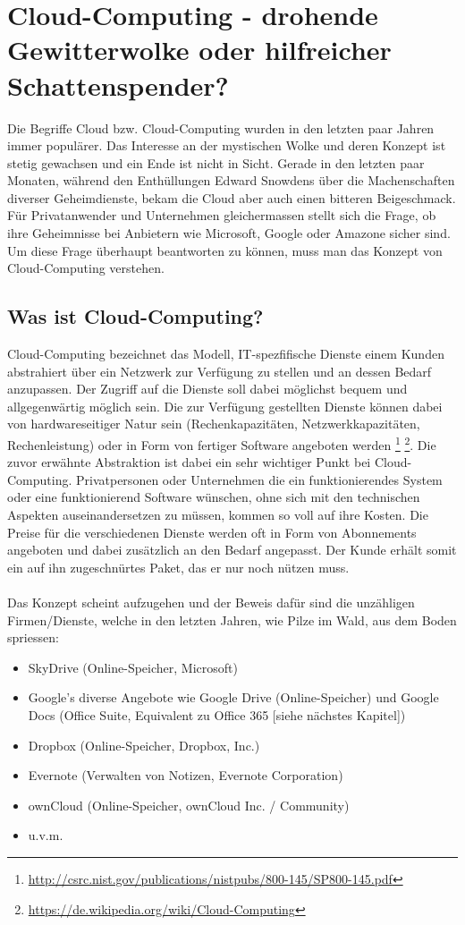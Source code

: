 \newpage
\section{Cloud-Computing - drohende Gewitterwolke oder hilfreicher Schattenspender?}
Die Begriffe Cloud bzw. Cloud-Computing wurden in den letzten paar Jahren immer populärer. Das Interesse an der mystischen Wolke und deren Konzept ist stetig gewachsen und ein Ende ist nicht in Sicht. Gerade in den letzten paar Monaten, während den Enthüllungen Edward Snowdens über die Machenschaften diverser Geheimdienste, bekam die Cloud aber auch einen bitteren Beigeschmack. Für Privatanwender und Unternehmen gleichermassen stellt sich die Frage, ob ihre Geheimnisse bei Anbietern wie Microsoft, Google oder Amazone sicher sind. Um diese Frage überhaupt beantworten zu können, muss man das Konzept von Cloud-Computing verstehen.

\subsection{Was ist Cloud-Computing?}
Cloud-Computing bezeichnet das Modell, IT-spezfifische Dienste einem Kunden abstrahiert über ein Netzwerk zur Verfügung zu stellen und an dessen Bedarf anzupassen. Der Zugriff auf die Dienste soll dabei möglichst bequem und allgegenwärtig möglich sein. Die zur Verfügung gestellten Dienste können dabei von hardwareseitiger Natur sein (Rechenkapazitäten, Netzwerkkapazitäten, Rechenleistung) oder in Form von fertiger Software angeboten werden 
\footnote{\url{http://csrc.nist.gov/publications/nistpubs/800-145/SP800-145.pdf}} 
\footnote{\url{https://de.wikipedia.org/wiki/Cloud-Computing}}. 
Die zuvor erwähnte Abstraktion ist dabei ein sehr wichtiger Punkt bei Cloud-Computing. Privatpersonen oder Unternehmen die ein funktionierendes System oder eine funktionierend Software wünschen, ohne sich mit den technischen Aspekten auseinandersetzen zu müssen, kommen so voll auf ihre Kosten. Die Preise für die verschiedenen Dienste werden oft in Form von Abonnements angeboten und dabei zusätzlich an den Bedarf angepasst. Der Kunde erhält somit ein auf ihn zugeschnürtes Paket, das er nur noch nützen muss.
\\
\\
Das Konzept scheint aufzugehen und der Beweis dafür sind die unzähligen Firmen/Dienste, welche in den letzten Jahren, wie Pilze im Wald, aus dem Boden spriessen:
\begin{itemize}
\item SkyDrive (Online-Speicher, Microsoft)
\item Google's diverse Angebote wie Google Drive (Online-Speicher) und Google Docs (Office Suite, Equivalent zu Office 365 [siehe nächstes Kapitel])
\item Dropbox (Online-Speicher, Dropbox, Inc.)
\item Evernote (Verwalten von Notizen, Evernote Corporation)
\item ownCloud (Online-Speicher, ownCloud Inc. / Community)
\item u.v.m.
\end{itemize}

